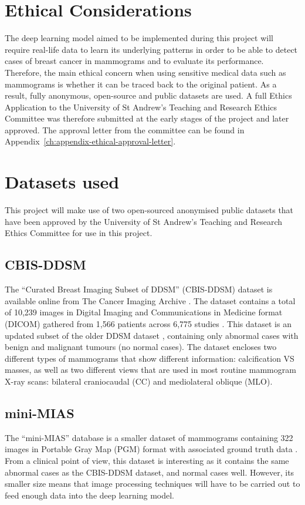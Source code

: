 \section{Ethical Considerations}

The deep learning model aimed to be implemented during this project will require real-life data to learn its underlying patterns in order to be able to detect cases of breast cancer in mammograms and to evaluate its performance. Therefore, the main ethical concern when using sensitive medical data such as  mammograms is whether it can be traced back to the original patient. As a result, fully anonymous, open-source and public datasets are used. A full Ethics Application to the University of St Andrew's Teaching and Research Ethics Committee was therefore submitted at the early stages of the project and later approved. The approval letter from the committee can be found in Appendix~\ref{ch:appendix-ethical-approval-letter}.


\section{Datasets used}

This project will make use of two open-sourced anonymised public datasets that have been approved by the University of St Andrew's Teaching and Research Ethics Committee for use in this project.

\subsection{CBIS-DDSM}

The ``Curated Breast Imaging Subset of DDSM'' (CBIS-DDSM) dataset \citep{Lee2017} is available online from The Cancer Imaging Archive \citep{Clark2013}. The dataset contains a total of 10,239 images in Digital Imaging and Communications in Medicine format (DICOM) gathered from 1,566 patients across 6,775 studies \citep{Lee2017}. This dataset is an updated subset of the older DDSM dataset \citep{DDSMdataset2001}, containing only abnormal cases with benign and malignant tumours (no normal cases). The dataset encloses two different types of mammograms that show different information: calcification VS masses, as well as two different views that are used in most routine mammogram X-ray scans: bilateral craniocaudal (CC) and mediolateral oblique (MLO). 

\subsection{mini-MIAS}

The ``mini-MIAS'' database is a smaller dataset of mammograms containing 322 images in Portable Gray Map (PGM) format with associated ground truth data \citep{Suckling1994}. From a clinical point of view, this dataset is interesting as it contains the same abnormal cases as the CBIS-DDSM dataset, and normal cases well. However, its smaller size means that image processing techniques will have to be carried out to feed enough data into the deep learning model.